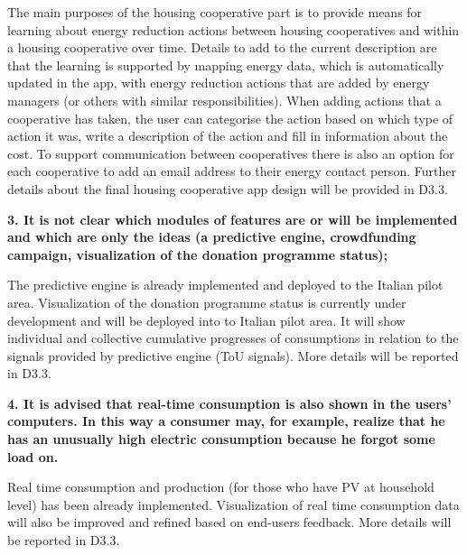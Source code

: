 The main purposes of the housing cooperative part is to provide means for learning about energy reduction actions between housing cooperatives and within a housing cooperative over time. Details to add to the current description are that the learning is supported by mapping energy data, which is automatically updated in the app, with energy reduction actions that are added by energy managers (or others with similar responsibilities). When adding actions that a cooperative has taken, the user can categorise the action based on which type of action it was, write a description of the action and fill in information about the cost. To support communication between cooperatives there is also an option for each cooperative to add an email address to their energy contact person. Further details about the final housing cooperative app design will be provided in D3.3. 

\vspace{3mm}

\noindent\textbf{3. It is not clear which modules of features are or will be implemented and which are only the ideas (a predictive engine, crowdfunding campaign, visualization of the donation programme status);}

\vspace{3mm}

The predictive engine is already implemented and deployed to the Italian pilot area.
Visualization of the donation programme status is currently under development and will be deployed into to Italian pilot area. It will show individual and collective cumulative progresses of consumptions in relation to the signals provided by predictive engine (ToU signals). More details will be reported in D3.3. 

\vspace{3mm}

\noindent\textbf{4. It is advised that real-time consumption is also shown in the users' computers. In this way a
consumer may, for example, realize that he has an unusually high electric consumption because he forgot some load on.}

\vspace{3mm}

Real time consumption and production (for those who have PV at household level) has been already implemented. Visualization of real time consumption data will also be improved and refined based on end-users feedback. More details will be reported in D3.3. 

\vspace{3mm}

